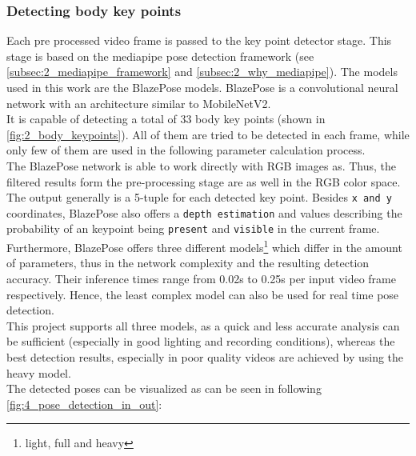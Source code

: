 \subsubsection*{Detecting body key points}
Each pre processed video frame is passed to the key point detector stage.
This stage is based on the mediapipe pose detection framework (see
\autoref{subsec:2_mediapipe_framework} and \autoref{subsec:2_why_mediapipe}).
The models used in this work are the BlazePose models.
BlazePose is a convolutional neural network with an architecture similar to
MobileNetV2.\\
It is capable of detecting a total of 33 body key points (shown in
\autoref{fig:2_body_keypoints}).
All of them are tried to be detected in each frame, while only few of them are
used in the following parameter calculation process.\\
The BlazePose network is able to work directly with RGB images as.
Thus, the filtered results form the pre-processing stage are as well in the
RGB color space.
The output generally is a 5-tuple for each detected key point.
Besides \texttt{x and y} coordinates, BlazePose also offers a
\texttt{depth estimation} and values describing the probability of an keypoint
being \texttt{present} and \texttt{visible} in the current frame. 
Furthermore, BlazePose offers three different models\footnote{light, full and
heavy} which differ in the amount of parameters, thus in the network
complexity and the resulting detection accuracy.
Their inference times range from 0.02s to 0.25s per input video frame
respectively.
Hence, the least complex model can also be used for real time pose detection.\\
This project supports all three models, as a quick and less accurate analysis
can be sufficient (especially in good lighting and recording conditions),
whereas the best detection results, especially in poor quality videos are
achieved by using the heavy model.\\
The detected poses can be visualized as can be seen in following
\autoref{fig:4_pose_detection_in_out}: 
